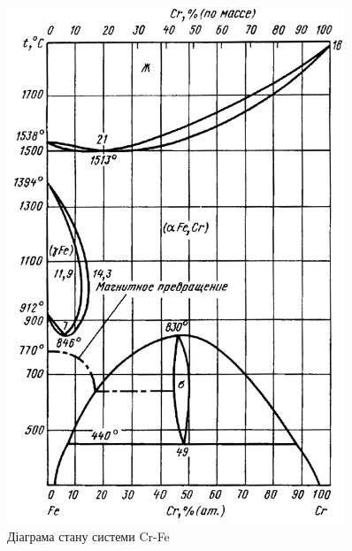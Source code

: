 \documentclass[a4paper,fontsize=14bp,ukrainian]{extreport}
\begin{document}
\begin{appendices}
\begin{figure}[p!]
\centering
\includegraphics[width=0.9\textwidth]{Cr-Fe.png}
\caption{Діаграма стану системи Cr-Fe~\cite{diag1997t2}}
\label{fig:phase_diag_Cr-Fe}
\end{figure}

\label{app:listings}








\end{appendices}
\end{document}
